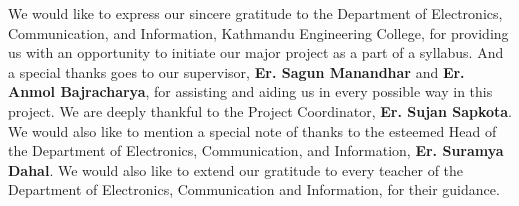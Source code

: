 We would like to express our sincere gratitude to the Department of Electronics, Communication, and Information, Kathmandu Engineering College, for providing us with an opportunity to initiate our major project as a part of a syllabus. And a special thanks goes to our supervisor, \textbf{Er. Sagun Manandhar} and \textbf{Er. Anmol Bajracharya}, for assisting and aiding us in every possible way in this project. We are deeply thankful to the Project Coordinator, \textbf{Er. Sujan Sapkota}. We would also like to mention a special note of thanks to the esteemed Head of the Department of Electronics, Communication, and Information, \textbf{Er. Suramya Dahal}. We would also like to extend our gratitude to every teacher of the Department of Electronics, Communication and Information, for their guidance.